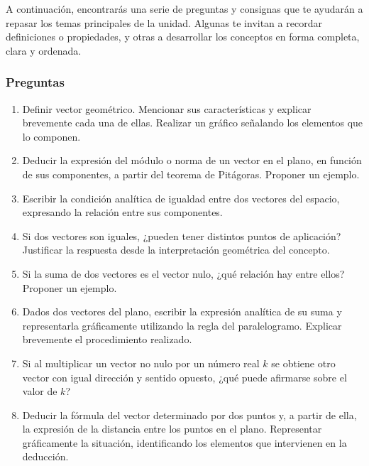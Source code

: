 A continuación, encontrarás una serie de preguntas y consignas que te ayudarán a repasar los temas principales de la unidad. Algunas te invitan a recordar definiciones o propiedades, y otras a desarrollar los conceptos en forma completa, clara y ordenada.

\subsubsection*{Preguntas}

\begin{enumerate}
    \item Definir vector geométrico. Mencionar sus características y explicar brevemente cada una de ellas. Realizar un gráfico señalando los elementos que lo componen.
    
    \item Deducir la expresión del módulo o norma de un vector en el plano, en función de sus componentes, a partir del teorema de Pitágoras. Proponer un ejemplo.
    
    \item Escribir la condición analítica de igualdad entre dos vectores del espacio, expresando la relación entre sus componentes.
    
    \item Si dos vectores son iguales, ¿pueden tener distintos puntos de aplicación? Justificar la respuesta desde la interpretación geométrica del concepto.
    
    \item Si la suma de dos vectores es el vector nulo, ¿qué relación hay entre ellos? Proponer un ejemplo.
    
    \item Dados dos vectores del plano, escribir la expresión analítica de su suma y representarla gráficamente utilizando la regla del paralelogramo. Explicar brevemente el procedimiento realizado.
    
    \item Si al multiplicar un vector no nulo por un número real $k$ se obtiene otro vector con igual dirección y sentido opuesto, ¿qué puede afirmarse sobre el valor de $k$?
    
    \item Deducir la fórmula del vector determinado por dos puntos y, a partir de ella, la expresión de la distancia entre los puntos en el plano. Representar gráficamente la situación, identificando los elementos que intervienen en la deducción.
    

\end{enumerate}
